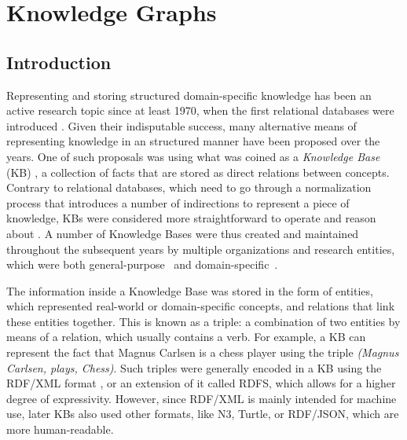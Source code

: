 \chapter{Knowledge Graphs}\label{chap:kgs}



\section{Introduction}\label{sec:kgs-intro}
Representing and storing structured domain-specific knowledge has been an active research topic since at least 1970, when the first relational databases were introduced \cite{codd1970}. Given their indisputable success, many alternative means of representing knowledge in an structured manner have been proposed over the years. One of such proposals was using what was coined as a \textit{Knowledge Base} (KB) \cite{hayes-roth1983}, a collection of facts that are stored as direct relations between concepts. Contrary to relational databases, which need to go through a normalization process that introduces a number of indirections to represent a piece of knowledge, KBs were considered more straightforward to operate and reason about \cite{russell2020}. A number of Knowledge Bases were thus created and maintained throughout the subsequent years by multiple organizations and research entities, which were both general-purpose~\cite{mahdisoltani2014,lehmann2015dbpedia, rebele2016, carlson2010, bollacker2008, vrandevcic2014} and domain-specific~\cite{chakravarty2017, thorn2013pharmgkb, wishart2009, wishart2008, kanehisa2010}.

The information inside a Knowledge Base was stored in the form of entities, which represented real-world or domain-specific concepts, and relations that link these entities together. This is known as a triple: a combination of two entities by means of a relation, which usually contains a verb. For example, a KB can represent the fact that Magnus Carlsen is a chess player using the triple \textit{(Magnus Carlsen, plays, Chess)}. Such triples were generally encoded in a KB using the RDF/XML format \cite{decker2000}, or an extension of it called RDFS, which allows for a higher degree of expressivity. However, since RDF/XML is mainly intended for machine use, later KBs also used other formats, like N3, Turtle, or RDF/JSON, which are more human-readable.

